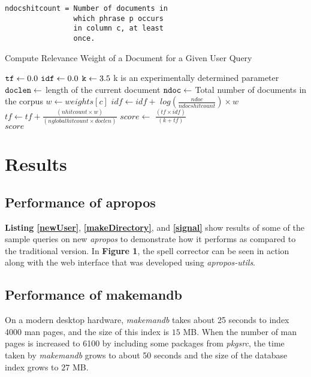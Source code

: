 \documentclass[letterpaper,twocolumn,10pt]{article}
\begin{document}
\begin{description}
{\begin{lstlisting}
ndocshitcount = Number of documents in
                which phrase p occurs
                in column c, at least
                once.
\end{lstlisting}
}
\begin{algorithm}
\caption{Compute Relevance Weight of a Document for a Given User Query}
\label{alg1}
\begin{algorithmic}[1]
\State ${\tt tf} \gets 0.0$
\State ${\tt idf} \gets 0.0$
\State ${\tt k} \gets 3.5$
\Comment 
{k is an experimentally determined parameter}
\State ${\tt doclen} \gets $ length of the current document
\State ${\tt ndoc} \gets $ Total number of documents in the corpus
\State $w \gets weights[c] $
\State $idf \gets idf + $ $log(\frac{ndoc}{ndocshitcount})\times w $
\State $tf \gets tf + \frac{(nhitcount \times w)}{(nglobalhitcount \times doclen)}$
\EndFor
\EndFor
\State $score \gets $ $\frac{(tf \times idf)}{(k + tf)}$ \\
\Return $score$
\end{algorithmic}
\end{algorithm}
\end{description}

\pagebreak
\section{Results}
\subsection{Performance of apropos}
{\bf Listing \ref{newUser}}, {\bf \ref{makeDirectory}}, and {\bf \ref{signal} } show results of some of the sample queries on new \textit{apropos}
to demonstrate how it performs as compared to the traditional version.
In \textbf{Figure 1}, the spell corrector can be seen in action along with the web
interface that was developed using \textit{apropos-utils}. \\


\subsection{Performance of makemandb} 
On a modern desktop hardware, \textit{makemandb} takes about 25 seconds
to index 4000 man pages, and the size of this index is $15$ MB. When 
the number of man pages is increased to 6100 by including some packages from
\textit{pkgsrc}, the time taken by \textit{makemandb} grows to about 50 seconds
and the size of the database index grows to $27$ MB. \\
\end{document}
